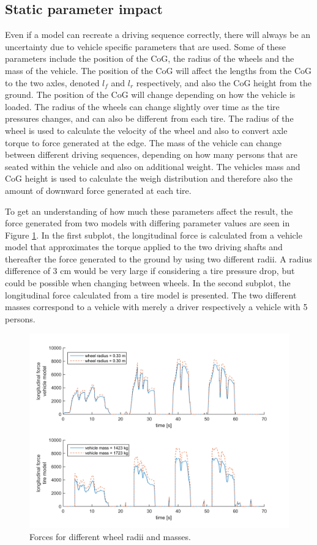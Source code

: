 \subsection{Static parameter impact} 
Even if a model can recreate a driving sequence correctly, there will always be an uncertainty due to vehicle specific parameters that are used. Some of these parameters include the position of the CoG, the radius of the wheels and the mass of the vehicle. The position of the CoG will affect the lengths from the CoG to the two axles, denoted $ l_{f} $ and $ l_{r} $ respectively, and also the CoG height from the ground. The position of the CoG will change depending on how the vehicle is loaded. The radius of the wheels can change slightly over time as the tire pressures changes, and can also be different from each tire. The radius of the wheel is used to calculate the velocity of the wheel and also to convert axle torque to force generated at the edge. The mass of the vehicle can change between different driving sequences, depending on how many persons that are seated within the vehicle and also on additional weight. The vehicles mass and CoG height is used to calculate the weigh distribution and therefore also the amount of downward force generated at each tire. 

To get an understanding of how much these parameters affect the result, the force generated from two models with differing parameter values are seen in Figure \ref{force_diff_re_mass}. In the first subplot, the longitudinal force is calculated from a vehicle model that approximates the torque applied to the two driving shafts and thereafter the force generated to the ground by using two different radii. A radius difference of $ 3 $ cm would be very large if considering a tire pressure drop, but could be possible when changing between wheels. In the second subplot, the longitudinal force calculated from a tire model is presented. The two different masses correspond to a vehicle with merely a driver respectively a vehicle with 5 persons. 

\begin{figure}[h]
	\centering
	\includegraphics[width=1.0\textwidth]{Pictures/force_diff_re_mass}
	\caption {Forces for different wheel radii and masses.}
	\label{force_diff_re_mass}
\end{figure}

